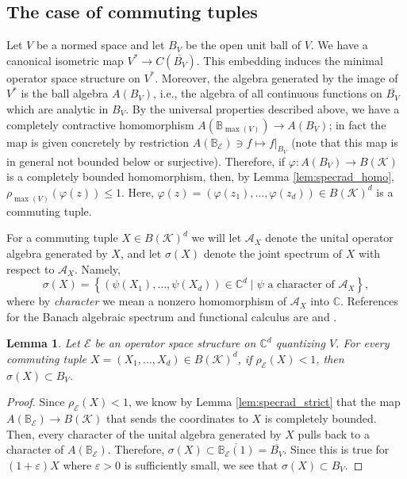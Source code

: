 \documentclass[12pt]{amsart}
\numberwithin{equation}{section}
\newtheorem{lemma}[theorem]{Lemma}
\theoremstyle{definition}
\newcommand{\cA}{\mathcal{A}}
\newcommand{\cE}{\mathcal{E}}
\newcommand{\cK}{\mathcal{K}}
\newcommand{\bB}{\mathbb{B}}
\newcommand{\bC}{\mathbb{C}}
\newcommand{\C}{\mathbb{C}}
\newcommand{\ol}{\overline}
\begin{document}

\subsection{The case of commuting tuples}

Let $V$ be a normed space and let $B_V$ be the open unit ball of $V$. We have a canonical isometric map $V^* \to C(\overline{B_V})$. 
This embedding induces the minimal operator space structure on $V^*$. Moreover, the algebra generated by the image of $V^*$ is the ball algebra $A(B_V)$, i.e., the algebra of all continuous functions on $\ol{B_V}$ which are analytic in $B_V$. 
By the universal properties described above, we have a completely contractive homomorphism $A(\bB_{\max(V)}) \to A(B_V)$; in fact the map is given concretely by restriction $A(\bB_\cE) \ni f \mapsto f \big|_{B_V}$ (note that this map is in general not bounded below or surjective). Therefore, if $\varphi \colon A(B_V) \to B(\cK)$ is a completely bounded homomorphism, then, by Lemma \ref{lem:specrad_homo}, $\rho_{\max(V)}(\varphi(z)) \leq 1$. Here, $\varphi(z) = (\varphi(z_1),\ldots,\varphi(z_d)) \in B(\cK)^d$ is a commuting tuple. 

For a commuting tuple $X \in B(\cK)^d$ we will let $\cA_X$ denote the unital operator algebra generated by $X$, and let $\sigma(X)$ denote the joint spectrum of $X$ with respect to $\cA_X$. Namely,
\[
\sigma(X) = \left\{ (\psi(X_1),\ldots, \psi(X_d)) \in \C^d \mid \psi \text{ a character of } \cA_X\right\}, 
\]
where by {\em character} we mean a nonzero homomorphism of $\cA_X$ into $\bC$. 
References for the Banach algebraic spectrum and functional calculus are \cite[Chapter I]{Gamelin-unifrom_alg} and \cite[Section III.4]{Gamelin-unifrom_alg}. 

\begin{lemma} \label{lem:specrad_implies_spectrum}
    Let $\cE$ be an operator space structure on $\C^d$ quantizing $V$. 
    For every commuting tuple $X = (X_1,\ldots,X_d) \in B(\cK)^d$, if $\rho_{\cE}(X) < 1$, then $\sigma(X) \subset B_V$.
\end{lemma}
\begin{proof}
Since $\rho_{\cE}(X) < 1$, we know by Lemma \ref{lem:specrad_strict} that the map $A(\bB_{\cE}) \to B(\cK)$ that sends the coordinates to $X$ is completely bounded. Then, every character of the unital algebra generated by $X$ pulls back to a character of $A(\bB_{\cE})$. Therefore, $\sigma(X) \subset \ol{\bB_\cE(1)} = \overline{B_V}$. Since this is true for $(1+\varepsilon)X$ where $\varepsilon > 0$ is sufficiently small, we see that $\sigma(X) \subset B_V$.
\end{proof}
\end{document}

